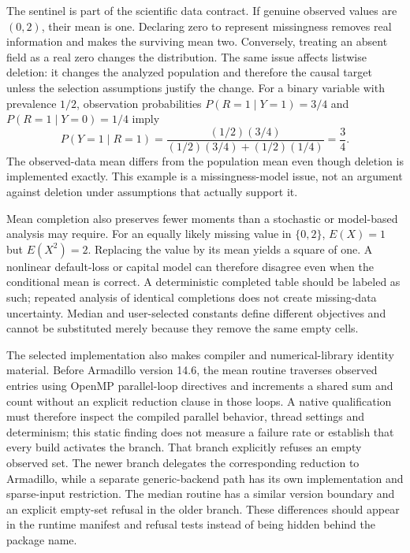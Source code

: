 The sentinel is part of the scientific data contract. If genuine observed values are $(0,2)$, their mean is one. Declaring zero to represent missingness removes real information and makes the surviving mean two. Conversely, treating an absent field as a real zero changes the distribution. The same issue affects listwise deletion: it changes the analyzed population and therefore the causal target unless the selection assumptions justify the change. For a binary variable with prevalence $1/2$, observation probabilities $P(R=1\mid Y=1)=3/4$ and $P(R=1\mid Y=0)=1/4$ imply
\[
 P(Y=1\mid R=1)=
 \frac{(1/2)(3/4)}{(1/2)(3/4)+(1/2)(1/4)}=\frac34.
\]
The observed-data mean differs from the population mean even though deletion is implemented exactly. This example is a missingness-model issue, not an argument against deletion under assumptions that actually support it.~\citep{exec25_ctm_mlpack,exec25_ctm_choice}

Mean completion also preserves fewer moments than a stochastic or model-based analysis may require. For an equally likely missing value in $\{0,2\}$, $E(X)=1$ but $E(X^2)=2$. Replacing the value by its mean yields a square of one. A nonlinear default-loss or capital model can therefore disagree even when the conditional mean is correct. A deterministic completed table should be labeled as such; repeated analysis of identical completions does not create missing-data uncertainty. Median and user-selected constants define different objectives and cannot be substituted merely because they remove the same empty cells.~\citep{exec25_ctm_choice}

The selected implementation also makes compiler and numerical-library identity material. Before Armadillo version 14.6, the mean routine traverses observed entries using OpenMP parallel-loop directives and increments a shared sum and count without an explicit reduction clause in those loops. A native qualification must therefore inspect the compiled parallel behavior, thread settings and determinism; this static finding does not measure a failure rate or establish that every build activates the branch. That branch explicitly refuses an empty observed set. The newer branch delegates the corresponding reduction to Armadillo, while a separate generic-backend path has its own implementation and sparse-input restriction. The median routine has a similar version boundary and an explicit empty-set refusal in the older branch. These differences should appear in the runtime manifest and refusal tests instead of being hidden behind the package name.~\citep{exec25_ctm_mlpack}

